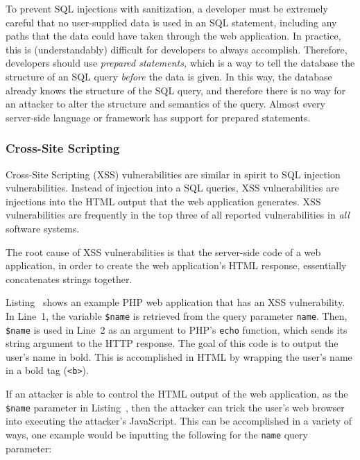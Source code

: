 To prevent SQL injections with sanitization, a developer must be
extremely careful that no user-supplied data is used in an SQL
statement, including any paths that the data could have taken through
the web application. In practice, this is (understandably) difficult
for developers to always accomplish. Therefore, developers should use
\emph{prepared statements,} which is a way to tell the database the
structure of an SQL query \emph{before} the data is given. In this
way, the database already knows the structure of the SQL query, and
therefore there is no way for an attacker to alter the structure and
semantics of the query. Almost every server-side language or framework
has support for prepared statements.

\subsubsection{Cross-Site Scripting}

Cross-Site Scripting (XSS) vulnerabilities are similar in spirit to
SQL injection vulnerabilities. Instead of injection into a SQL
queries, XSS vulnerabilities are injections into the HTML output that
the web application generates. XSS vulnerabilities are frequently in
the top three of all reported vulnerabilities in \emph{all} software
systems.

The root cause of XSS vulnerabilities is that the server-side code of
a web application, in order to create the web application's HTML
response, essentially concatenates strings together.



Listing~ shows an example PHP web application
that has an XSS vulnerability. In Line~1, the variable \texttt{\$name}
is retrieved from the query parameter \texttt{name}. Then,
\texttt{\$name} is used in Line~2 as an argument to PHP's
\texttt{echo} function, which sends its string argument to the HTTP
response. The goal of this code is to output the user's name in bold.
This is accomplished in HTML by wrapping the user's name in a bold tag
(\texttt{<b>}).

If an attacker is able to control the HTML output of the web
application, as the \texttt{\$name} parameter in
Listing~, then the attacker can trick the user's
web browser into executing the attacker's JavaScript. This can be
accomplished in a variety of ways, one example would be inputting the
following for the \texttt{name} query parameter:

